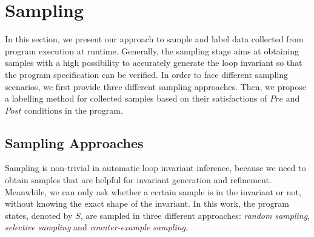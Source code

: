 
\section{Sampling} %
\label{sec:sampling}

In this section, we present our approach to sample and label data 
collected from program execution at runtime. 
Generally, the sampling stage aims at obtaining samples with a high possibility to 
accurately generate the loop invariant so that the program specification can be verified. 
In order to face different sampling scenarios, 
we first provide three different sampling approaches. 
Then, we propose a labelling method for collected samples 
based on their satisfactions of $\mathit{Pre}$ and $\mathit{Post}$ conditions in the program. 

\subsection{Sampling Approaches} %
\label{subsec:sampling:approaches}

Sampling is non-trivial in automatic loop invariant inference, 
because we need to obtain samples that are helpful for invariant generation and refinement. 
Meanwhile, we can only ask whether a certain sample is in the invariant or not, 
without knowing the exact shape of the invariant. 
In this work, the program states, denoted by $S$, are sampled in three different approaches: 
\emph{random sampling}, \emph{selective sampling} and \emph{counter-example sampling}. 

